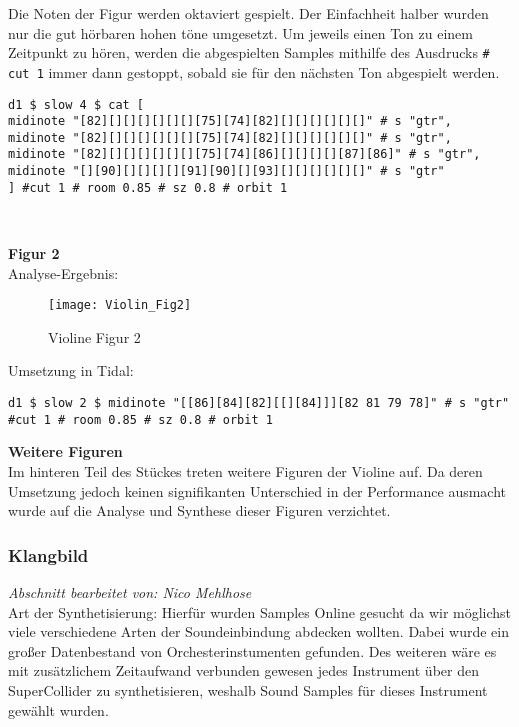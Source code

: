 \documentclass[
10pt, %
a4paper, %
oneside, %
headinclude,footinclude, %
BCOR5mm, %
]{scrartcl}
\begin{document}
\noindent Die Noten der Figur werden oktaviert gespielt. Der Einfachheit halber wurden nur die gut hörbaren hohen töne umgesetzt. Um jeweils einen Ton zu einem Zeitpunkt zu hören, werden die abgespielten Samples mithilfe des Ausdrucks \verb|# cut 1| immer dann gestoppt, sobald sie für den nächsten Ton abgespielt werden.\cite{tid12}

\begin{lstlisting}
d1 $ slow 4 $ cat [
midinote "[82][][][][][][][75][74][82][][][][][][]" # s "gtr",
midinote "[82][][][][][][][75][74][82][][][][][][]" # s "gtr",
midinote "[82][][][][][][][75][74][86][][][][][87][86]" # s "gtr",
midinote "[][90][][][][][91][90][][93][][][][][][]" # s "gtr"
] #cut 1 # room 0.85 # sz 0.8 # orbit 1 
\end{lstlisting}\

\noindent\textbf{Figur 2}\\
Analyse-Ergebnis:
\begin{figure}[h]
	\centering 
	\texttt{[image: Violin\_Fig2]} 
	\caption{Violine Figur 2}
\end{figure}

\noindent Umsetzung in Tidal:
\begin{lstlisting}
d1 $ slow 2 $ midinote "[[86][84][82][[][84]]][82 81 79 78]" # s "gtr" #cut 1 # room 0.85 # sz 0.8 # orbit 1
\end{lstlisting}

\noindent\textbf{Weitere Figuren}\\
Im hinteren Teil des Stückes treten weitere Figuren der Violine auf. Da deren Umsetzung jedoch keinen signifikanten Unterschied in der Performance ausmacht wurde auf die Analyse und Synthese dieser Figuren verzichtet.

\subsubsection{Klangbild}
\textit{Abschnitt bearbeitet von: Nico Mehlhose}\\

\noindent 
Art der Synthetisierung: Hierfür wurden Samples Online gesucht da wir möglichst viele verschiedene Arten der Soundeinbindung abdecken wollten. Dabei wurde ein großer Datenbestand von Orchesterinstumenten gefunden.\cite{Orch} Des weiteren wäre es mit zusätzlichem Zeitaufwand verbunden gewesen jedes Instrument über den SuperCollider zu synthetisieren, weshalb Sound Samples für dieses Instrument gewählt wurden.\\
\end{document}
